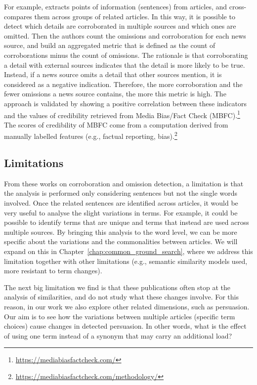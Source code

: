For example, \cite{bountouridis2018explaining} extracts points of information (sentences) from articles, and cross-compares them across groups of related articles. In this way, it is possible to detect which details are corroborated in multiple sources and which ones are omitted.
Then the authors count the omissions and corroboration for each news source, and build an aggregated metric that is defined as the count of corroborations minus the count of omissions.
The rationale is that corroborating a detail with external sources indicates that the detail is more likely to be true.
Instead, if a news source omits a detail that other sources mention, it is considered as a negative indication.
Therefore, the more corroboration and the fewer omissions a news source contains, the more this metric is high.
The approach is validated by showing a positive correlation between these indicators and the values of credibility retrieved from Media Bias/Fact Check (MBFC).\footnote{\url{https://mediabiasfactcheck.com/}}
The scores of credibility of MBFC come from a computation derived from manually labelled features (e.g., factual reporting, bias).\footnote{\url{https://mediabiasfactcheck.com/methodology/}}

\subsection{\statusgreen Limitations}

From these works on corroboration and omission detection, a limitation is that the analysis is performed only considering sentences but not the single words involved.
Once the related sentences are identified across articles, it would be very useful to analyse the slight variations in terms.
For example, it could be possible to identify terms that are unique and terms that instead are used across multiple sources. By bringing this analysis to the word level, we can be more specific about the variations and the commonalities between articles.
We will expand on this in Chapter~\ref{chap:common_ground_search}, where we address this limitation together with other limitations (e.g., semantic similarity models used, more resistant to term changes).

The next big limitation we find is that these publications often stop at the analysis of similarities, and do not study what these changes involve.
For this reason, in our work we also explore other related dimensions, such as persuasion.
Our aim is to see how the variations between multiple articles (specific term choices) cause changes in detected persuasion. In other words, what is the effect of using one term instead of a synonym that may carry an additional load?


